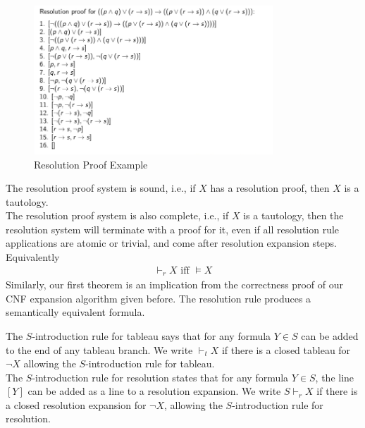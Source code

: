 \documentclass[a4paper]{article}
\theoremstyle{plain}
\newtheorem{thm}{Theorem}[section]
\theoremstyle{definition}
\newtheorem{defn}{Definition}[section]
\newtheorem{exmp}{Example}[section]
\theoremstyle{remark}
\begin{document}
\begin{tcolorbox}[colback=black!3!white,colframe=black!60!white,title=\begin{exmp}Resolution Proof  Example \label{Resolution Proof  Example}\end{exmp}]
\begin{figure}[H]
	\centering
	\includegraphics[width=0.8\textwidth]{one.png}
	\caption{Resolution Proof Example}
	\label{fig:one-png}
\end{figure}
\end{tcolorbox}
\begin{tcolorbox}[colback=black!3!white,colframe=black!60!white,title=\begin{thm}Soundness and Completeness \label{Soundness and Completeness}\end{thm}]
	The resolution proof system is sound, i.e., if $X$ has a resolution proof, then $X$ is a tautology.\\ 
	The resolution proof system is also complete, i.e., if $X$ is a tautology, then the resolution system will terminate with a proof for it, even if all resolution rule applications are atomic or trivial, and come after resolution expansion steps. Equivalently
	\begin{align}
		\vdash_r X \text{ iff } \vDash X
	\end{align}
	Similarly, our first theorem is an implication from the correctness proof of our CNF expansion algorithm given before. The resolution rule produces a semantically equivalent formula.
\end{tcolorbox}
\begin{tcolorbox}[colback=black!3!white,colframe=black!60!white,title=\begin{defn}S-introduction rule \label{S-introduction rule}\end{defn}]
The $S$-introduction rule for tableau says that for any formula $Y \in S$ can be added to the end of any tableau branch. We write $\vdash_t X$ if there is a closed tableau for $\neg X$ allowing the $S$-introduction rule for tableau. \\

The $S$-introduction rule for resolution states that for any formula $Y \in S$, the line $[Y]$ can be added as a line to a resolution expansion. We write $S \vdash_r X$ if there is a closed resolution expansion for $\neg X$, allowing the $S$-introduction rule for resolution.
\end{tcolorbox}
\end{document}

